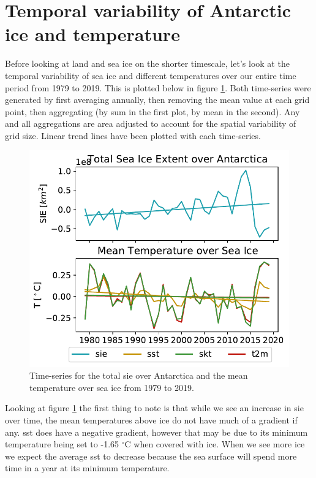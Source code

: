 \documentclass[../main.tex]{subfiles}
\begin{document}
\section{Temporal variability of Antarctic ice and temperature}
Before looking at land and sea ice on the shorter timescale, let's look at the temporal variability of sea ice and different temperatures over our entire time period from 1979 to 2019. This is plotted below in figure \ref{fig:timeseries_seaice_temperature_longterm}. Both time-series were generated by first averaging annually, then removing the mean value at each grid point, then aggregating (by sum in the first plot, by mean in the second). Any and all aggregations are area adjusted to account for the spatial variability of grid size. Linear trend lines have been plotted with each time-series.
\begin{figure}[ht!]
    \centering
    \includegraphics{images/week8/hres/seaice_temperature_timeseries}
    \caption{Time-series for the total \gls{sie} over Antarctica and the mean temperature over sea ice from 1979 to 2019. }
    \label{fig:timeseries_seaice_temperature_longterm}
\end{figure}
Looking at figure \ref{fig:timeseries_seaice_temperature_longterm} the first thing to note is that while we see an increase in \gls{sie} over time, the mean temperatures above ice do not have much of a gradient if any. \gls{sst} does have a negative gradient, however that may be due to its minimum temperature being set to -1.65 $^\circ$C when covered with ice. When we see more ice we expect the average \gls{sst} to decrease because the sea surface will spend more time in a year at its minimum temperature.
\end{document}

